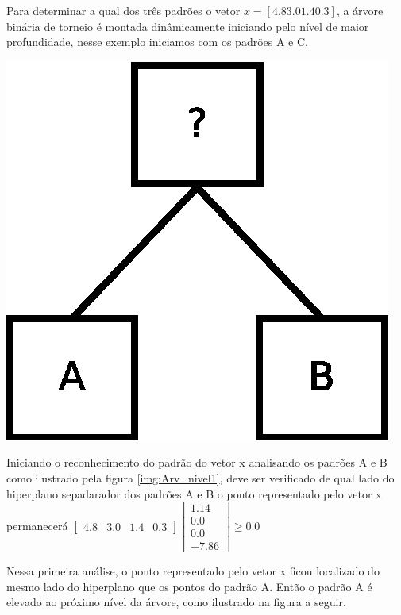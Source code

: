 Para determinar a qual dos três padrões o vetor $x = [4.8  3.0  1.4  0.3]$, a árvore binária de torneio é montada dinâmicamente iniciando pelo nível de maior profundidade, nesse exemplo iniciamos com os padrões A e C.

\begin{center}
	\includegraphics[scale=0.4]{graficos/arvore_nivel1}
	\label{img:Arv_nivel1}
\end{center}

Iniciando o reconhecimento do padrão do vetor x analisando os padrões A e B como ilustrado pela figura \ref{img:Arv_nivel1}, deve ser verificado de qual lado do hiperplano sepadarador dos padrões A e B o ponto representado pelo vetor x permanecerá
$ \begin{bmatrix}
4.8 & 3.0 & 1.4 & 0.3 
\end{bmatrix}
\begin{bmatrix}
1.14
\\ 
0.0
\\
0.0 
\\
-7.86 
\end{bmatrix}
\geq  0.0 $ 

Nessa primeira análise, o ponto representado pelo vetor x ficou localizado do mesmo lado do hiperplano que os pontos do padrão A. Então o padrão A é elevado ao próximo nível da árvore, como ilustrado na figura a seguir.

